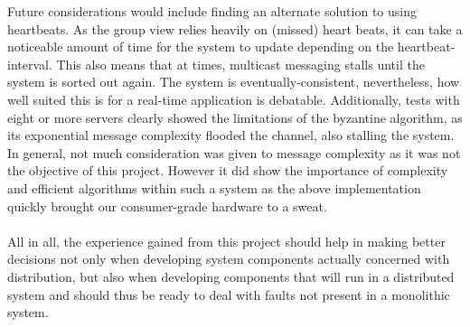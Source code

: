 \documentclass[runningheads]{llncs}
\begin{document}
Future considerations would include finding an alternate solution to using heartbeats. As the group view relies heavily on (missed) heart beats, it can take a noticeable amount of time for the system to update depending on the heartbeat-interval.
This also means that at times, multicast messaging stalls until the system is sorted out again. The system is eventually-consistent, nevertheless, how well suited this is for a real-time application is debatable.
Additionally, tests with eight or more servers clearly showed the limitations of the byzantine algorithm, as its exponential message complexity flooded the channel, also stalling the system.
In general, not much consideration was given to message complexity as it was not the objective of this project. However it did show the importance of complexity and efficient algorithms within such a system as the above implementation quickly brought our consumer-grade hardware to a sweat.
\\\\
All in all, the experience gained from this project should help in making better decisions not only when developing system components actually concerned with distribution, but also when developing components that will run in a distributed system and should thus be ready to deal with faults not present in a monolithic system.
\end{document}
